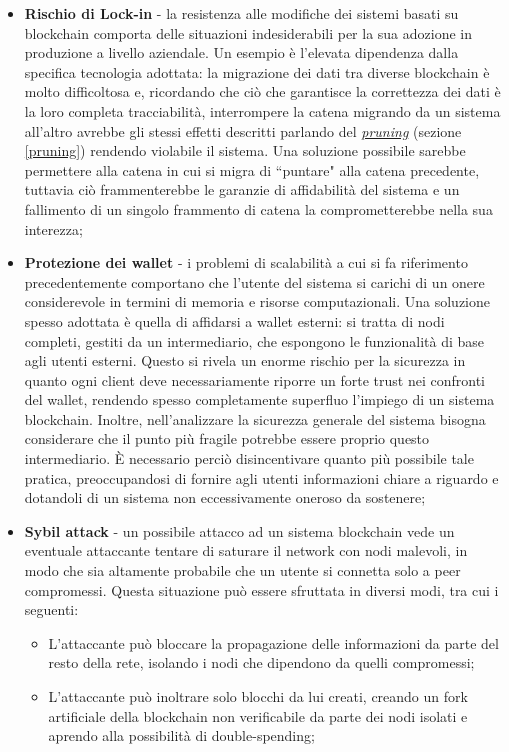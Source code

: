 \begin{itemize}
				\item \textbf{Rischio di Lock-in} - la resistenza alle modifiche dei sistemi basati su blockchain comporta delle situazioni indesiderabili per la sua adozione in produzione a livello aziendale. Un esempio è l'elevata dipendenza dalla specifica tecnologia adottata: la migrazione dei dati tra diverse blockchain è molto difficoltosa e, ricordando che ciò che garantisce la correttezza dei dati è la loro completa tracciabilità, interrompere la catena migrando da un sistema all'altro avrebbe gli stessi effetti descritti parlando del \hyperref[pruning]{\emph{pruning}} (sezione \ref{pruning}) rendendo violabile il sistema. Una soluzione possibile sarebbe permettere alla catena in cui si migra di ``puntare" alla catena precedente, tuttavia ciò frammenterebbe le garanzie di affidabilità del sistema e un fallimento di un singolo frammento di catena la comprometterebbe nella sua interezza;
				\item \textbf{Protezione dei wallet} - i problemi di scalabilità a cui si fa riferimento precedentemente comportano che l'utente del sistema si carichi di un onere considerevole in termini di memoria e risorse computazionali. Una soluzione spesso adottata è quella di affidarsi a wallet esterni: si tratta di nodi completi, gestiti da un intermediario, che espongono le funzionalità di base agli utenti esterni. Questo si rivela un enorme rischio per la sicurezza in quanto ogni client deve necessariamente riporre un forte trust nei confronti del wallet, rendendo spesso completamente superfluo l'impiego di un sistema blockchain. Inoltre, nell'analizzare la sicurezza generale del sistema bisogna considerare che il punto più fragile potrebbe essere proprio questo intermediario. È necessario perciò disincentivare quanto più possibile tale pratica, preoccupandosi di fornire agli utenti informazioni chiare a riguardo e dotandoli di un sistema non eccessivamente oneroso da sostenere;
				\item \textbf{Sybil attack} - un possibile attacco ad un sistema blockchain vede un eventuale attaccante tentare di saturare il network con nodi malevoli, in modo che sia altamente probabile che un utente si connetta solo a peer compromessi. Questa situazione può essere sfruttata in diversi modi, tra cui i seguenti:
				\begin{itemize}
					\item L'attaccante può bloccare la propagazione delle informazioni da parte del resto della rete, isolando i nodi che dipendono da quelli compromessi;
					\item L'attaccante può inoltrare solo blocchi da lui creati, creando un fork artificiale della blockchain non verificabile da parte dei nodi isolati e aprendo alla possibilità di double-spending;

\end{itemize}
\end{itemize}
